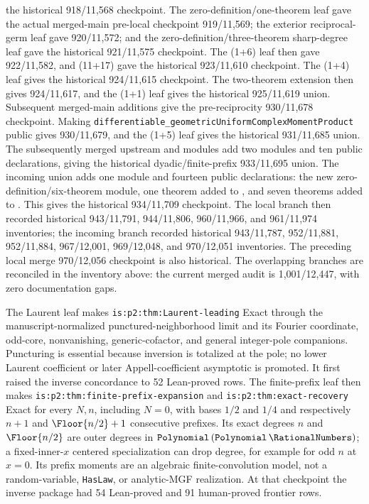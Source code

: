 \documentclass[11pt,oneside]{article}
\theoremstyle{definition}
\theoremstyle{remark}
\newcommand{\lean}[1]{%
  \ifmmode\text{\texttt{\detokenize{#1}}}\else\nolinkurl{#1}\fi}
\begin{document}
the historical 918/11,568 checkpoint.  The zero-definition/one-theorem
 leaf gave the actual merged-main
pre-local checkpoint 919/11,569; the exterior reciprocal-germ leaf gave
920/11,572; and the zero-definition/three-theorem sharp-degree leaf gave the
historical 921/11,575 checkpoint.  The
 (1+6) leaf then gave 922/11,582, and
 (11+17) gave the historical 923/11,610
checkpoint.  The  (1+4) leaf gives
the historical 924/11,615 checkpoint.  The two-theorem
 extension then gives 924/11,617, and
the  (1+1) leaf gives the historical
925/11,619 union.  Subsequent merged-main additions give the pre-reciprocity
930/11,678 checkpoint.  Making
\lean{differentiable_geometricUniformComplexMomentProduct} public gives
930/11,679, and the  (1+5) leaf
gives the historical 931/11,685 union.  The subsequently merged upstream
 and
 modules add two modules and ten
public declarations, giving the historical dyadic/finite-prefix 933/11,695
union.  The incoming union adds one module and fourteen public declarations:
the new zero-definition/six-theorem  module,
one theorem added to , and seven theorems
added to .  This gives the historical
934/11,709 checkpoint.  The local branch then recorded historical
943/11,791, 944/11,806, 960/11,966, and 961/11,974 inventories; the incoming
branch recorded historical 943/11,787, 952/11,881, 952/11,884, 967/12,001,
969/12,048, and 970/12,051 inventories.  The preceding local merge
970/12,056 checkpoint is also historical.
The overlapping branches are reconciled in the inventory above: the current
merged audit is 1,001/12,447, with zero documentation gaps.

The Laurent leaf makes \nolinkurl{is:p2:thm:Laurent-leading} Exact through
the manuscript-normalized punctured-neighborhood limit and its Fourier
coordinate, odd-core, nonvanishing, generic-cofactor, and general integer-pole
companions.  Puncturing is essential because inversion is totalized at the
pole; no lower Laurent coefficient or later Appell-coefficient asymptotic is
promoted.  It first raised the inverse concordance to 52 Lean-proved rows.
The finite-prefix leaf then makes
\nolinkurl{is:p2:thm:finite-prefix-expansion} and
\nolinkurl{is:p2:thm:exact-recovery} Exact for every \(N,n\), including
\(N=0\), with bases \(1/2\) and \(1/4\) and respectively \(n+1\) and
\(\Floor{n/2}+1\) consecutive prefixes.  Its exact degrees \(n\) and
\(\Floor{n/2}\) are outer degrees in
\(\lean{Polynomial}\,(\lean{Polynomial}\,\RationalNumbers)\); a fixed-inner-\(x\)
centered specialization can drop degree, for example for odd \(n\) at
\(x=0\).  Its prefix moments are an algebraic finite-convolution model, not a
random-variable, \lean{HasLaw}, or analytic-MGF realization.  At that
checkpoint the inverse package had 54 Lean-proved and 91 human-proved
frontier rows.
\end{document}
